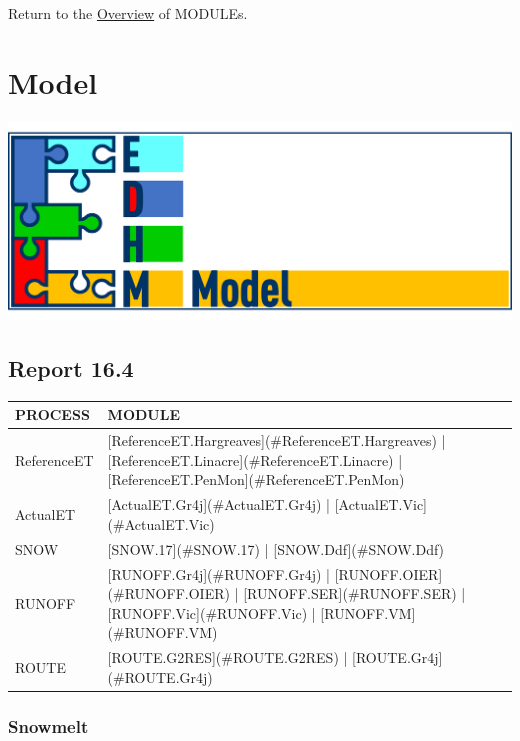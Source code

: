 \documentclass[
]{book}
\begin{document}
Return to the \protect\hyperlink{module}{Overview} of MODULEs.

\hypertarget{model}{%
\chapter{Model}\label{model}}

\includegraphics{fig/EDHM_model.png}

\hypertarget{report-16.4}{%
\section{Report 16.4}\label{report-16.4}}

\begin{table}[!h]
\centering
\begin{tabular}{l|l}
\hline
PROCESS & MODULE\\
\hline
ReferenceET & [ReferenceET.Hargreaves](\#ReferenceET.Hargreaves) | [ReferenceET.Linacre](\#ReferenceET.Linacre) | [ReferenceET.PenMon](\#ReferenceET.PenMon)\\
\cline{1-2}
ActualET & [ActualET.Gr4j](\#ActualET.Gr4j) | [ActualET.Vic](\#ActualET.Vic)\\
\cline{1-2}
SNOW & [SNOW.17](\#SNOW.17) | [SNOW.Ddf](\#SNOW.Ddf)\\
\cline{1-2}
RUNOFF & [RUNOFF.Gr4j](\#RUNOFF.Gr4j) | [RUNOFF.OIER](\#RUNOFF.OIER) | [RUNOFF.SER](\#RUNOFF.SER) | [RUNOFF.Vic](\#RUNOFF.Vic) | [RUNOFF.VM](\#RUNOFF.VM)\\
\cline{1-2}
ROUTE & [ROUTE.G2RES](\#ROUTE.G2RES) | [ROUTE.Gr4j](\#ROUTE.Gr4j)\\
\hline
\end{tabular}
\end{table}

\hypertarget{snowmelt}{%
\subsection{Snowmelt}\label{snowmelt}}
\end{document}
